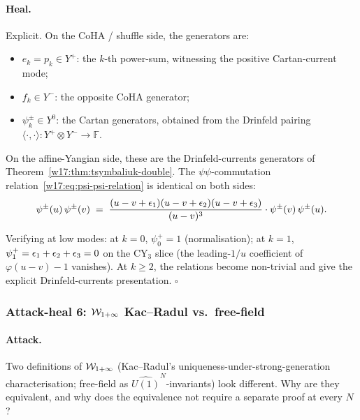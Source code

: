 \paragraph{Heal.}
Explicit. On the CoHA / shuffle side, the generators are:
\begin{itemize}
\item $e_k = p_k \in Y^+$: the $k$-th power-sum, witnessing the positive
Cartan-current mode;
\item $f_k \in Y^-$: the opposite CoHA generator;
\item $\psi^\pm_k \in Y^0$: the Cartan generators, obtained from the
Drinfeld pairing
$\langle\cdot, \cdot\rangle: Y^+ \otimes Y^- \to \mathbb{F}$.
\end{itemize}
On the affine-Yangian side, these are the Drinfeld-currents generators of
Theorem~\ref{w17:thm:tsymbaliuk-double}. The $\psi\psi$-commutation
relation~\eqref{w17:eq:psi-psi-relation} is identical on both sides:
\[
 \psi^\pm(u)\, \psi^\pm(v)
 \;=\; \frac{(u - v + \epsilon_1)(u - v + \epsilon_2)(u - v + \epsilon_3)}{(u - v)^3} \cdot
 \psi^\pm(v)\, \psi^\pm(u).
\]

Verifying at low modes: at $k = 0$, $\psi_0^+ = 1$ (normalisation); at
$k = 1$, $\psi_1^+ = \epsilon_1 + \epsilon_2 + \epsilon_3 = 0$ on the CY$_3$ slice
(the leading-$1/u$ coefficient of $\varphi(u - v) - 1$ vanishes). At $k \geq 2$,
the relations become non-trivial and give the explicit Drinfeld-currents
presentation.
\hfill$\square$

\subsubsection{Attack-heal 6: $\mathcal{W}_{1+\infty}$ Kac--Radul vs.\ free-field}
\label{w17:subsubsec:ah6-w-inf}

\paragraph{Attack.}
Two definitions of $\mathcal{W}_{1+\infty}$ (Kac--Radul's uniqueness-under-strong-generation
characterisation; free-field as $\widehat{U(1)}^N$-invariants) look different.
Why are they equivalent, and why does the equivalence not require a separate
proof at every $N$?

